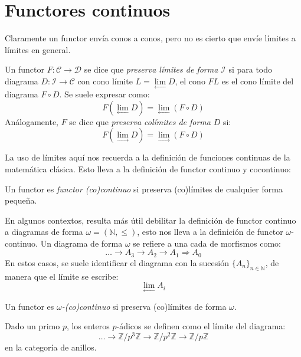 \documentclass[12pt, twoside]{book}
\newcommand{\cat}{{\mathcal{C}}}
\newcommand{\Z}{{\mathbb{Z}}}
\begin{document}
\section{Functores continuos}
Claramente un functor envía conos a conos, pero no es cierto que envíe límites a límites en general.

\begin{definition}
Un functor $F \colon \cat \to \mathcal{D}$ se dice que \emph{preserva límites de forma} $\mathcal{I}$ si para todo diagrama $D \colon \mathcal{I} \to \cat$ con cono límite $L = \underset{\longleftarrow}\lim D$, el cono $F L$ es el cono límite del diagrama $F \circ D$.
Se suele expresar como:
\[ F\left(\underset{\longleftarrow}\lim D\right) = \underset{\longleftarrow}\lim \left(F \circ D\right)\]
Análogamente, $F$ se dice que \emph{preserva colímites de forma} $D$ si:
\[ F\left(\underset{\longrightarrow}\lim D\right) = \underset{\longrightarrow}\lim \left(F \circ D\right)\]
\end{definition}

La uso de límites aquí nos recuerda a la definición de funciones continuas de la matemática clásica.
Esto lleva a la definición de functor continuo y cocontinuo:
\begin{definition}
Un functor es \emph{functor (co)continuo} si preserva (co)límites de cualquier forma pequeña.
\end{definition}

En algunos contextos, resulta más útil debilitar la definición de functor continuo a diagramas de forma $\omega = (\mathbb{N}, \leq)$, esto nos lleva a la definición de functor $\omega$-continuo.
Un diagrama de forma $\omega$ se refiere a una cada de morfismos como:
\[ \dots \rightarrow A_3 \rightarrow A_2 \rightarrow A_1 \Rightarrow A_0 \]
En estos casos, se suele identificar el diagrama con la sucesión $\{A_n\}_{n \in \mathbb{N}}$, de manera que el límite se escribe:
\[ \underset{\longleftarrow}\lim A_i\]
\begin{definition}
Un functor es $\omega$\emph{-(co)continuo} si preserva (co)límites de forma $\omega$.
\end{definition}
\begin{example}
Dado un primo $p$, los enteros $p$-ádicos se definen como el límite del diagrama:
\[ \dots \rightarrow \mathbb{Z}/p^3\Z \rightarrow \mathbb{Z}/p^2\Z \rightarrow \mathbb{Z}/p\Z \]
en la categoría de anillos.
\end{example}
\end{document}
